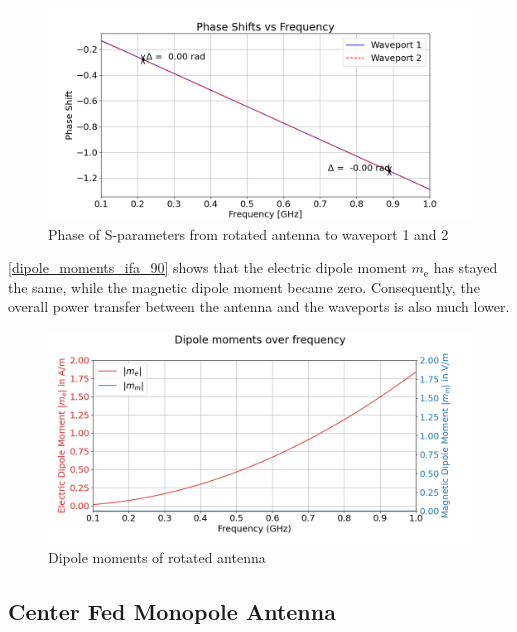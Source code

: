 \begin{figure}[h]
    \centering
    \includegraphics[width=1\linewidth]{content//30_simulations//img/phase_shift_90_ifa.png}
    \caption{Phase of S-parameters from rotated antenna to waveport 1 and 2}
    \label{fig:phase_shift_90_ifa}
\end{figure}

\autoref{dipole_moments_ifa_90} shows that the electric dipole moment $m_\mathrm{e}$ has stayed the same, while the magnetic dipole moment became zero. Consequently, the overall power transfer between the antenna and the waveports is also much lower. 


\begin{figure}[h]
    \centering
    \includegraphics[width=1\linewidth]{content//30_simulations//img/dipole_moments_ifa_90.png}
    \caption{Dipole moments of rotated antenna}
    \label{fig:dipole_moments_ifa_90}
\end{figure}


\subsection{Center Fed Monopole Antenna}

